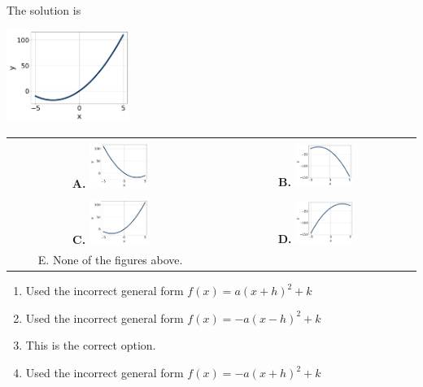 \documentclass{extbook}[14pt]
\begin{document}
 
 The solution is  
 \begin{center} \includegraphics[width=0.3\textwidth]{../Figures/quadraticEquationToGraphCA.png} \end{center}\begin{tabular}{|c|c|} 
\hline 
 & \tabularnewline 
 \textbf{A.} \includegraphics[width=0.3\textwidth]{../Figures/quadraticEquationToGraphAA.png} & \textbf{B.} \includegraphics[width=0.3\textwidth]{../Figures/quadraticEquationToGraphBA.png} \tabularnewline 
\hline 
 & \tabularnewline 
 \textbf{C.} \includegraphics[width=0.3\textwidth]{../Figures/quadraticEquationToGraphCA.png} & \textbf{D.} \includegraphics[width=0.3\textwidth]{../Figures/quadraticEquationToGraphDA.png} \tabularnewline 
\hline 
 E. None of the figures above. & \tabularnewline 
\hline 
 \end{tabular} 
 
\begin{enumerate}[label=\Alph*.] 
\item Used the incorrect general form $f(x) = a(x+h)^2 + k$  
\item Used the incorrect general form $f(x) = -a(x-h)^2 + k$  
\item This is the correct option.  
\item Used the incorrect general form $f(x) = -a(x+h)^2 + k$  
\end{enumerate} 
 
\end{document}

